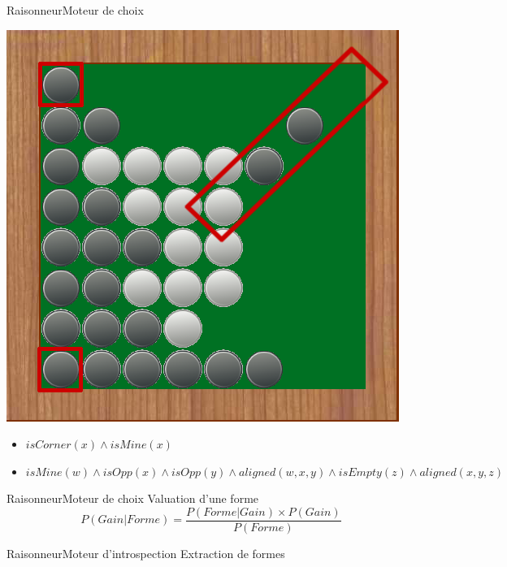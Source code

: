 \begin{frame}{Raisonneur}{Moteur de choix}
	\begin{minipage}{0.45\textwidth}
		\includegraphics[width=\textwidth]{img/screenshoot/raisonneur_choix_2}
	\end{minipage}
	\begin{minipage}{0.50\textwidth}
		\begin{itemize}
			\item $isCorner(x) \wedge isMine(x)$
			\item $isMine(w) \wedge isOpp(x) \wedge isOpp(y) \wedge aligned(w,x,y) \wedge isEmpty(z) \wedge aligned (x,y,z)$
		\end{itemize}
	\end{minipage}
\end{frame}

\begin{frame}{Raisonneur}{Moteur de choix}
	Valuation d'une forme
	\[ P(Gain|Forme) = \frac{P(Forme|Gain) \times P(Gain)}{P(Forme)} \]
\end{frame}

\begin{frame}{Raisonneur}{Moteur d'introspection}
Extraction de formes
\end{frame}
